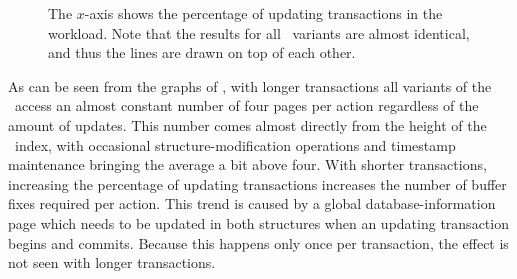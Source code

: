 \begin{figure}[!htb]
\begin{center}
%
{The $x$-axis shows the percentage of updating transactions in the
workload. 
Note that the results for all \TSBtree\ variants are almost identical, and
thus the lines are drawn on top of each other.}
\label{fig:qu-initial-fix}
\end{center}
\end{figure}

As can be seen from the graphs of ,
with longer transactions all variants of the \TSBtree\ access an almost
constant number of four pages per action regardless of the amount of
updates.
This number comes almost directly from the height of the \TSBtree\
index, with occasional structure-modification operations and timestamp
maintenance bringing the average a bit above four.
With shorter transactions, increasing the percentage of updating
transactions increases the number of buffer fixes required per action.
This trend is caused by a global database-information page which needs
to be updated in both structures when an updating transaction begins 
and commits.
Because this happens only once per transaction, the effect is not seen
with longer transactions.

